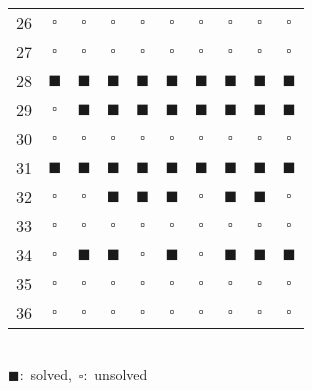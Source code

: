 \begin{table}
\begin{tabular}[t]{c | c | c | c | c | c | c | c | c | c}
			26 & $\square$ & $\square$ & $\square$ & $\square$ & $\square$ & $\square$ & $\square$ & $\square$ & $\square$ \\
			27 & $\square$ & $\square$ & $\square$ & $\square$ & $\square$ & $\square$ & $\square$ & $\square$ & $\square$ \\
			28 & $\blacksquare$ & $\blacksquare$ & $\blacksquare$ & $\blacksquare$ & $\blacksquare$ & $\blacksquare$ & $\blacksquare$ & $\blacksquare$ & $\blacksquare$ \\
			29 & $\square$ & $\blacksquare$ & $\blacksquare$ & $\blacksquare$ & $\blacksquare$ & $\blacksquare$ & $\blacksquare$ & $\blacksquare$ & $\blacksquare$ \\
			30 & $\square$ & $\square$ & $\square$ & $\square$ & $\square$ & $\square$ & $\square$ & $\square$ & $\square$ \\
			31 & $\blacksquare$ & $\blacksquare$ & $\blacksquare$ & $\blacksquare$ & $\blacksquare$ & $\blacksquare$ & $\blacksquare$ & $\blacksquare$ & $\blacksquare$ \\
			32 & $\square$ & $\square$ & $\blacksquare$ & $\blacksquare$ & $\blacksquare$ & $\square$ & $\blacksquare$ & $\blacksquare$ & $\square$ \\ 
			33 & $\square$ & $\square$ & $\square$ & $\square$ & $\square$ & $\square$ & $\square$ & $\square$ & $\square$ \\
			34 & $\square$ & $\blacksquare$ & $\blacksquare$ & $\square$ & $\blacksquare$ & $\square$ & $\blacksquare$ & $\blacksquare$ & $\blacksquare$ \\
			35 & $\square$ & $\square$ & $\square$ & $\square$ & $\square$ & $\square$ & $\square$ & $\square$ & $\square$ \\
			36 & $\square$ & $\square$ & $\square$ & $\square$ & $\square$ & $\square$ & $\square$ & $\square$ & $\square$ \\
			\hline
		\end{tabular}
	\\[.3em]
	\mbox{$\blacksquare$: solved, $\square$: unsolved}

\end{table}